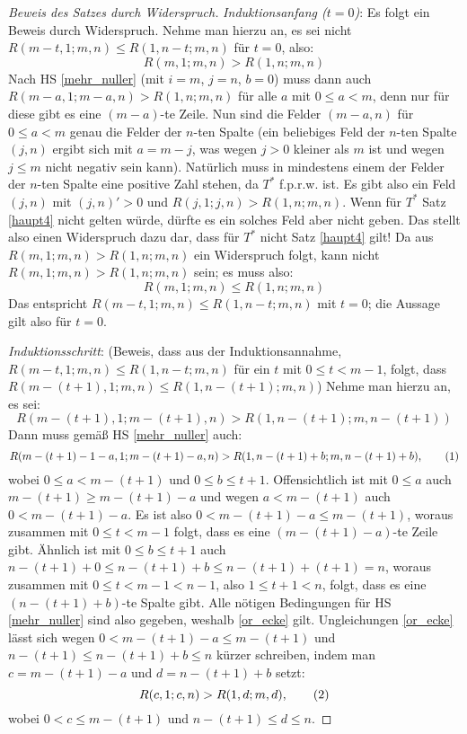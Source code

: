 \begin{proof}[Beweis des Satzes durch Widerspruch]
    \textit{Induktionsanfang ($t=0$)}: Es folgt ein Beweis durch Widerspruch. Nehme man hierzu an, es sei nicht 
    $R(m-t, 1; m, n)\leq R(1, n-t; m, n)$ für $t=0$, also:
    \[
        R(m, 1; m, n)>R(1, n; m, n)
    \]
    Nach HS \ref{mehr_nuller} (mit $i=m$, $j=n$, $b=0$) muss dann auch $R(m-a, 1; m-a, n) > R(1, n; m, n)$ für alle 
    $a$ mit $0\leq a<m$, denn nur für diese gibt es eine $(m-a)$-te Zeile. Nun sind die Felder $(m-a, n)$ für $0\leq 
    a<m$ genau die Felder der $n$-ten Spalte (ein beliebiges Feld der $n$-ten Spalte $(j, n)$ ergibt sich mit $a=m-j$, 
    was wegen $j>0$ kleiner als $m$ ist und wegen $j\leq m$ nicht negativ sein kann). Natürlich muss in mindestens einem 
    der Felder der $n$-ten Spalte eine positive Zahl stehen, da $T^*$ f.p.r.w. ist. Es gibt also ein Feld $(j, n)$ 
    mit $(j, n)'>0$ und $R(j, 1; j, n)>R(1, n; m, n)$. Wenn für $T^*$ Satz \ref{haupt4} nicht gelten würde, dürfte 
    es ein solches Feld aber nicht geben. Das stellt also einen Widerspruch dazu dar, dass für $T^*$ nicht 
    Satz \ref{haupt4} gilt! Da aus $R(m, 1; m, n)>R(1, n; m, n)$ ein Widerspruch folgt, kann nicht $R(m, 1; m, n)>
    R(1, n; m, n)$ sein; es muss also:
    \[
        R(m, 1; m, n)\leq R(1, n; m, n)
    \]
    Das entspricht $R(m-t, 1; m, n)\leq R(1, n-t; m, n)$ mit $t=0$; die Aussage gilt also für $t=0$.

    \textit{Induktionsschritt}: (Beweis, dass aus der Induktionsannahme, $R(m-t, 1; m, n)\leq R(1, n-t; m, n)$ für 
    ein $t$ mit $0\leq t<m-1$, folgt, dass $R(m-(t+1), 1; m, n)\leq R(1, n-(t+1); m, n)$) Nehme man hierzu an, es sei:
    \[
        R(m-(t+1), 1; m-(t+1), n)>R(1, n-(t+1); m, n-(t+1))
    \]
    Dann muss gemäß HS \ref{mehr_nuller} auch:
    \[
        R(m-(t+1)-1-a, 1; m-(t+1)-a, n)>R(1, n-(t+1)+b; m, n-(t+1)+b), \numberthis \label{or_ecke}
    \]
    wobei $0\leq a<m-(t+1)$ und $0\leq b\leq t+1$. Offensichtlich ist mit $0\leq a$ auch $m-(t+1)\geq m-(t+1)-a$ und 
    wegen $a<m-(t+1)$ auch $0<m-(t+1)-a$. Es ist also $0<m-(t+1)-a\leq m-(t+1)$, woraus zusammen mit $0\leq t<m-1$ 
    folgt, dass es eine $(m-(t+1)-a)$-te Zeile gibt. Ähnlich ist mit $0\leq b\leq t+1$ auch $n-(t+1)+0\leq 
    n-(t+1)+b\leq n-(t+1)+(t+1)=n$, woraus zusammen mit $0\leq t<m-1<n-1$, also $1\leq t+1<n$, folgt, dass es eine 
    $(n-(t+1)+b)$-te Spalte gibt. Alle nötigen Bedingungen für HS \ref{mehr_nuller} sind also gegeben, weshalb 
    \eqref{or_ecke} gilt. Ungleichungen \eqref{or_ecke} lässt sich wegen $0<m-(t+1)-a\leq m-(t+1)$ und $n-(t+1)\leq 
    n-(t+1)+b\leq n$ kürzer schreiben, indem man $c=m-(t+1)-a$ und $d=n-(t+1)+b$ setzt:
    \[
        R(c, 1; c, n)>R(1, d; m, d), \numberthis \label{or_eck}
    \]
    wobei $0<c\leq m-(t+1)$ und $n-(t+1)\leq d\leq n$.


\end{proof}
